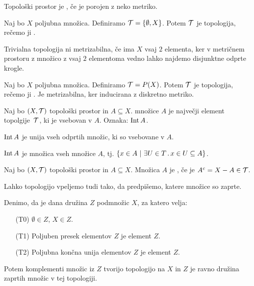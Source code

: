 \begin{definicija}
    Topološki prostor je , če je porojen z neko metriko.
\end{definicija}

\begin{primer}
    Naj bo $X$ poljubna množica. Definiramo $\mathcal{T} = \left\{\emptyset, X\right\}$. Potem $\mathcal{T}$ je topologija, rečemo ji .

    Trivialna topologija ni metrizabilna, če ima $X$ vsaj $2$ elementa, ker v metričnem prostoru z množico z vsaj $2$ elementoma vedno lahko najdemo disjunktne odprte krogle.
\end{primer}

\begin{primer}
    Naj bo $X$ poljubna množica. Definiramo $\mathcal{T} = P(X)$. Potem $\mathcal{T}$ je topologija, rečemo ji .
    Je metrizabilna, ker inducirana z diskretno metriko.
\end{primer}

\begin{definicija}
    Naj bo $(X, \mathcal{T})$ topološki prostor in $A \subseteq X$.  množice $A$ je največji element topolgije~$\mathcal{T}$, ki je vsebovan v $A$. Oznaka: $\operatorname{Int} A$.
\end{definicija}

\begin{trditev}
    $\operatorname{Int} A$ je unija vseh odprtih množic, ki so vsebovane v $A$.
\end{trditev}

\begin{trditev}
    $\operatorname{Int} A$ je množica vseh  množice $A$, tj. $\left\{x \in A \ | \ \exists U \in T \,.\, x \in U \subseteq A\right\}$.
\end{trditev}

\begin{definicija}
    Naj bo $(X, \mathcal{T})$ topološki prostor in $A \subseteq X$. Množica $A$ je , če je $A^c = X - A \in \mathcal{T}$.
\end{definicija}

\begin{opomba}
    Lahko topologijo vpeljemo tudi tako, da predpišemo, katere množice so zaprte.

    Denimo, da je dana družina $Z$ podmnožic $X$, za katero velja:
    \begin{enumerate}
        \item[(T0)] $\emptyset \in Z$, $X \in Z$.
        \item[(T1)] Poljuben presek elementov $Z$ je element $Z$.
        \item[(T2)] Poljubna končna unija elementov $Z$ je element $Z$.
    \end{enumerate}
    Potem komplementi množic iz $Z$ tvorijo topologijo na $X$ in $Z$ je ravno družina zaprtih množic v tej topologiji.
\end{opomba}

